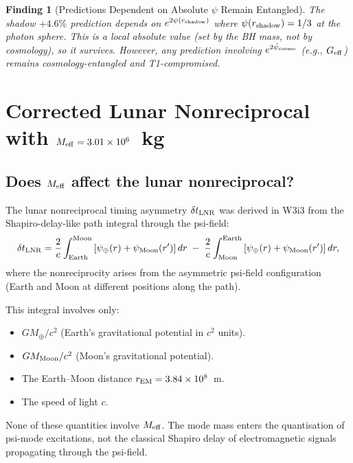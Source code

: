 \documentclass[11pt]{article}
\newtheorem{finding}{Finding}
\newcommand{\ee}[1]{\times 10^{#1}}
\newcommand{\psicosmo}{\bar{\psi}_{\rm cosmo}}
\newcommand{\Meff}{M_{\rm eff}}
\begin{document}
\begin{finding}[Predictions Dependent on Absolute $\psi$ Remain Entangled]
\label{find:partition-entangled}
The shadow $+4.6\%$ prediction depends on $e^{2\psi(r_{\rm shadow})}$ where
$\psi(r_{\rm shadow}) = 1/3$ at the photon sphere. This is a \emph{local}
absolute value (set by the BH mass, not by cosmology), so it survives.
However, any prediction involving $e^{2\psicosmo}$ (e.g., $G_{\rm eff}$)
remains cosmology-entangled and T1-compromised.
\end{finding}

\section{Corrected Lunar Nonreciprocal with $\Meff = 3.01\ee{6}$~kg}
\label{sec:LNR-Meff}

\subsection{Does $\Meff$ affect the lunar nonreciprocal?}

The lunar nonreciprocal timing asymmetry $\delta t_{\rm LNR}$ was derived in
W3i3 from the Shapiro-delay-like path integral through the psi-field:
\begin{equation}
\delta t_{\rm LNR} = \frac{2}{c}\int_{\rm Earth}^{\rm Moon}
\left[\psi_\oplus(r) + \psi_{\rm Moon}(r')\right]dr
\;-\;\frac{2}{c}\int_{\rm Moon}^{\rm Earth}
\left[\psi_\oplus(r) + \psi_{\rm Moon}(r')\right]dr,
\label{eq:LNR-integral}
\end{equation}
where the nonreciprocity arises from the asymmetric psi-field configuration
(Earth and Moon at different positions along the path).

This integral involves only:
\begin{itemize}
\item $GM_\oplus/c^2$ (Earth's gravitational potential in $c^2$ units).
\item $GM_{\rm Moon}/c^2$ (Moon's gravitational potential).
\item The Earth--Moon distance $r_{\rm EM} = 3.84\ee{8}$~m.
\item The speed of light $c$.
\end{itemize}

None of these quantities involve $\Meff$. The mode mass enters the
quantisation of psi-mode excitations, not the classical Shapiro delay
of electromagnetic signals propagating through the psi-field.
\end{document}

